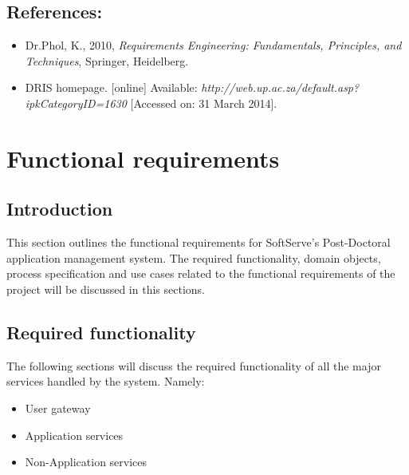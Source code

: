 \documentclass[12pt]{article}
\begin{document}
\vspace{0.2in}

\subsection{References:}
\vspace{0.1in}
\begin{itemize}
\item Dr.Phol, K., 2010, \textit{Requirements Engineering: Fundamentals, Principles, and Techniques}, Springer, Heidelberg.
\item DRIS homepage. [online] Available: \textit{http://web.up.ac.za/default.asp?ipkCategoryID=1630} [Accessed on: 31 March 2014].
\end{itemize}	

\vspace{0.5in}

\newpage
\section{Functional requirements}
\subsection{Introduction} %
\vspace{0.2in}
This section outlines the functional requirements for SoftServe's Post-Doctoral application management system.
The required functionality, domain objects, process specification and use cases related to the functional requirements of the project will be discussed in this sections.
\vspace{0.2in}

\subsection{Required functionality} %
\vspace{0.2in}
The following sections will discuss the required functionality of all the major services handled by the system. Namely:
\begin{itemize}
	\item User gateway
	\item Application services
	\item Non-Application services
\end{itemize}
\end{document}
